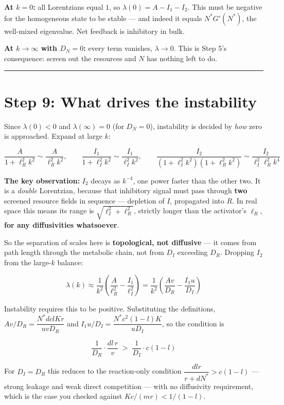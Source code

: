 \documentclass[11pt]{article}
\begin{document}
\textbf{At $k=0$:} all Lorentzians equal $1$, so $\lambda(0) = A - I_1 - I_2$. This must be negative for the homogeneous state to be stable --- and indeed it equals $N^*G'(N^*)$, the well-mixed eigenvalue. Net feedback is inhibitory in bulk.

\textbf{At $k\to\infty$ with $D_N=0$:} every term vanishes, $\lambda\to 0$. This is Step 5's consequence: screen out the resources and $N$ has nothing left to do.

\bigskip\hrule\bigskip

\section*{Step 9: What drives the instability}

Since $\lambda(0)<0$ and $\lambda(\infty)=0$ (for $D_N=0$), instability is decided by \emph{how} zero is approached. Expand at large $k$:

\[
\frac{A}{1+\ell_R^2k^2} \sim \frac{A}{\ell_R^2k^2}, \qquad \frac{I_1}{1+\ell_I^2k^2}\sim\frac{I_1}{\ell_I^2k^2}, \qquad \frac{I_2}{(1+\ell_I^2k^2)(1+\ell_R^2k^2)} \sim \frac{I_2}{\ell_I^2\ell_R^2 k^4}
\]

\textbf{The key observation:} $I_2$ decays as $k^{-4}$, one power faster than the other two. It is a \emph{double} Lorentzian, because that inhibitory signal must pass through \textbf{two} screened resource fields in sequence --- depletion of $I$, propagated into $R$. In real space this means its range is $\sqrt{\ell_I^2 + \ell_R^2}$, strictly longer than the activator's $\ell_R$, \textbf{for any diffusivities whatsoever}.

So the separation of scales here is \textbf{topological, not diffusive} --- it comes from path length through the metabolic chain, not from $D_I$ exceeding $D_R$. Dropping $I_2$ from the large-$k$ balance:

\[
\lambda(k) \approx \frac{1}{k^2}\left(\frac{A}{\ell_R^2} - \frac{I_1}{\ell_I^2}\right) = \frac{1}{k^2}\left(\frac{Av}{D_R} - \frac{I_1 u}{D_I}\right)
\]

Instability requires this to be positive. Substituting the definitions, $Av/D_R = \dfrac{N^*d clKr}{uvD_R}$ and $I_1u/D_I = \dfrac{N^*c^2(1-l)K}{uD_I}$, so the condition is

\[
\boxed{\;\frac{1}{D_R}\cdot\frac{d l\,r}{v} \;>\; \frac{1}{D_I}\cdot c(1-l)\;}
\]

For $D_I = D_R$ this reduces to the reaction-only condition $\dfrac{d lr}{r+d N^*} > c(1-l)$ --- strong leakage and weak direct competition --- with no diffusivity requirement, which is the case you checked against $Kc/(mr) < 1/(1-l)$.
\end{document}

